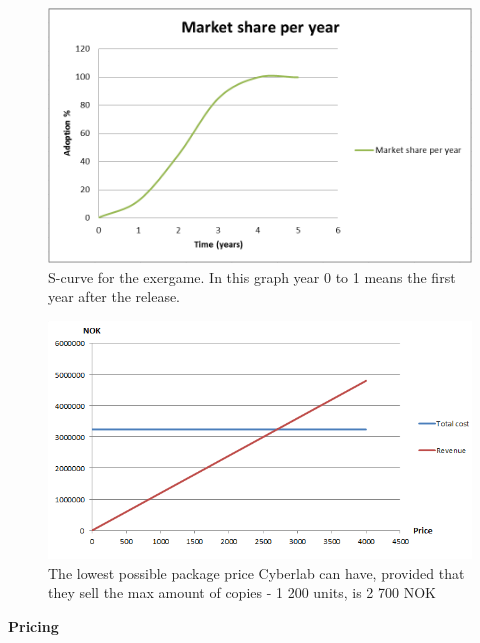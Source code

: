 \begin{figure}
\begin{center}
\includegraphics[scale=0.5]{scurve2}
\caption[The S-curve]{S-curve for the exergame. In this graph year 0 to 1 means the first year after the release.}
\label{fig:scurve2}
\end{center}
\end{figure}
\begin{figure}
\begin{center}
\includegraphics[scale=0.8]{revenuestreamprice}
\caption[Price example]{The lowest possible package price Cyberlab can have, provided that they sell the max amount of  copies - 1 200 units, is 2 700 NOK}
\label{fig:RevenueStreamPrice}
\end{center}
\end{figure}
\textbf{Pricing}\\ \\
